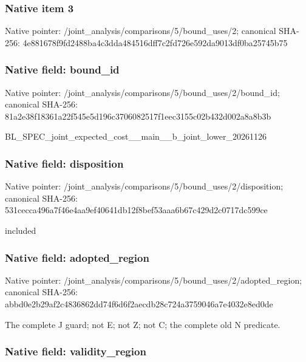 \documentclass[10pt,a4paper]{article}
\begin{document}
\subsubsection{Native item 3}


Native pointer: /joint\_analysis/comparis\allowbreak{}ons/5/bound\_uses/2; canonical SHA-256: 4e881678f9fd2488ba4c3dda\allowbreak{}484516dff7c2fd726e592da9\allowbreak{}013df0ba25745b75



\subsubsection{Native field: bound\_id}


Native pointer: /joint\_analysis/comparis\allowbreak{}ons/5/bound\_uses/2/bound\allowbreak{}\_id; canonical SHA-256: 81a2e38f18361a22f545e5d1\allowbreak{}96c3706082517f1eec3155c0\allowbreak{}2b432d002a8a8b3b


BL\_SPEC\_joint\_expected\_c\allowbreak{}ost\_\_main\_\_b\_joint\_lower\allowbreak{}\_20261126


\subsubsection{Native field: disposition}


Native pointer: /joint\_analysis/comparis\allowbreak{}ons/5/bound\_uses/2/dispo\allowbreak{}sition; canonical SHA-256: 531cecca496a7f46e4aa9ef4\allowbreak{}0641db12f8bef53aaa6b67c4\allowbreak{}29d2c0717dc599ce


included


\subsubsection{Native field: adopted\_region}


Native pointer: /joint\_analysis/comparis\allowbreak{}ons/5/bound\_uses/2/adopt\allowbreak{}ed\_region; canonical SHA-256: abbd0e2b29af2c4836862dd7\allowbreak{}4f6d6f2aecdb28c724a37590\allowbreak{}46a7e4032e8ed0de


The complete J guard; not E; not Z; not C; the complete old N predicate.


\subsubsection{Native field: validity\_region}
\end{document}
